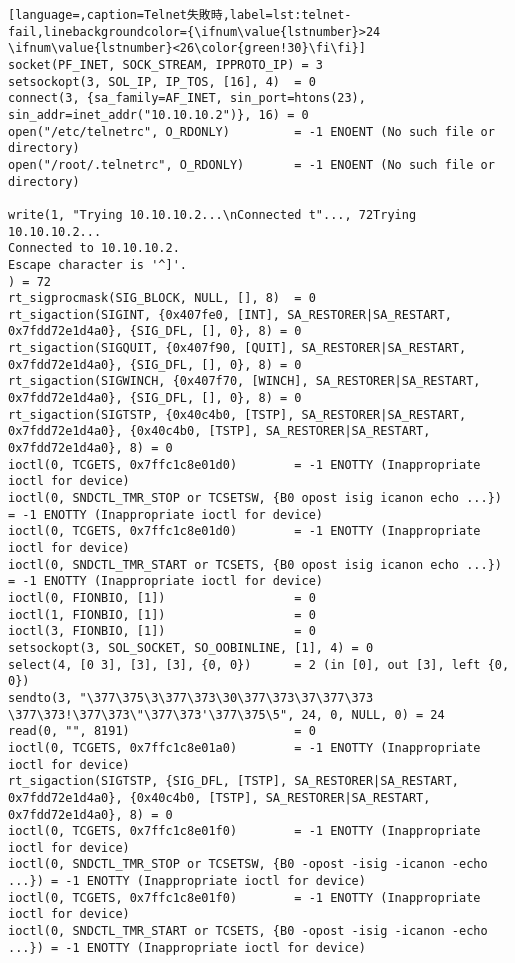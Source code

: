 \begin{lstlisting}[language=,caption=Telnet失敗時,label=lst:telnet-fail,linebackgroundcolor={\ifnum\value{lstnumber}>24 \ifnum\value{lstnumber}<26\color{green!30}\fi\fi}]
socket(PF_INET, SOCK_STREAM, IPPROTO_IP) = 3
setsockopt(3, SOL_IP, IP_TOS, [16], 4)  = 0
connect(3, {sa_family=AF_INET, sin_port=htons(23), sin_addr=inet_addr("10.10.10.2")}, 16) = 0
open("/etc/telnetrc", O_RDONLY)         = -1 ENOENT (No such file or directory)
open("/root/.telnetrc", O_RDONLY)       = -1 ENOENT (No such file or directory)

write(1, "Trying 10.10.10.2...\nConnected t"..., 72Trying 10.10.10.2...
Connected to 10.10.10.2.
Escape character is '^]'.
) = 72
rt_sigprocmask(SIG_BLOCK, NULL, [], 8)  = 0
rt_sigaction(SIGINT, {0x407fe0, [INT], SA_RESTORER|SA_RESTART, 0x7fdd72e1d4a0}, {SIG_DFL, [], 0}, 8) = 0
rt_sigaction(SIGQUIT, {0x407f90, [QUIT], SA_RESTORER|SA_RESTART, 0x7fdd72e1d4a0}, {SIG_DFL, [], 0}, 8) = 0
rt_sigaction(SIGWINCH, {0x407f70, [WINCH], SA_RESTORER|SA_RESTART, 0x7fdd72e1d4a0}, {SIG_DFL, [], 0}, 8) = 0
rt_sigaction(SIGTSTP, {0x40c4b0, [TSTP], SA_RESTORER|SA_RESTART, 0x7fdd72e1d4a0}, {0x40c4b0, [TSTP], SA_RESTORER|SA_RESTART, 0x7fdd72e1d4a0}, 8) = 0
ioctl(0, TCGETS, 0x7ffc1c8e01d0)        = -1 ENOTTY (Inappropriate ioctl for device)
ioctl(0, SNDCTL_TMR_STOP or TCSETSW, {B0 opost isig icanon echo ...}) = -1 ENOTTY (Inappropriate ioctl for device)
ioctl(0, TCGETS, 0x7ffc1c8e01d0)        = -1 ENOTTY (Inappropriate ioctl for device)
ioctl(0, SNDCTL_TMR_START or TCSETS, {B0 opost isig icanon echo ...}) = -1 ENOTTY (Inappropriate ioctl for device)
ioctl(0, FIONBIO, [1])                  = 0
ioctl(1, FIONBIO, [1])                  = 0
ioctl(3, FIONBIO, [1])                  = 0
setsockopt(3, SOL_SOCKET, SO_OOBINLINE, [1], 4) = 0
select(4, [0 3], [3], [3], {0, 0})      = 2 (in [0], out [3], left {0, 0})
sendto(3, "\377\375\3\377\373\30\377\373\37\377\373 \377\373!\377\373\"\377\373'\377\375\5", 24, 0, NULL, 0) = 24
read(0, "", 8191)                       = 0
ioctl(0, TCGETS, 0x7ffc1c8e01a0)        = -1 ENOTTY (Inappropriate ioctl for device)
rt_sigaction(SIGTSTP, {SIG_DFL, [TSTP], SA_RESTORER|SA_RESTART, 0x7fdd72e1d4a0}, {0x40c4b0, [TSTP], SA_RESTORER|SA_RESTART, 0x7fdd72e1d4a0}, 8) = 0
ioctl(0, TCGETS, 0x7ffc1c8e01f0)        = -1 ENOTTY (Inappropriate ioctl for device)
ioctl(0, SNDCTL_TMR_STOP or TCSETSW, {B0 -opost -isig -icanon -echo ...}) = -1 ENOTTY (Inappropriate ioctl for device)
ioctl(0, TCGETS, 0x7ffc1c8e01f0)        = -1 ENOTTY (Inappropriate ioctl for device)
ioctl(0, SNDCTL_TMR_START or TCSETS, {B0 -opost -isig -icanon -echo ...}) = -1 ENOTTY (Inappropriate ioctl for device)

\end{lstlisting}
